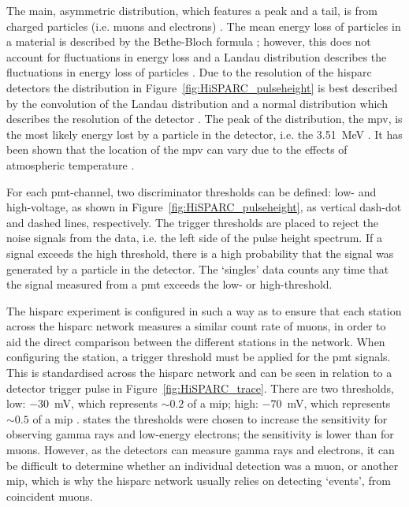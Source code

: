 The main, asymmetric distribution, which features a peak and a tail, is from charged particles (i.e. muons and electrons) \citep{van_dam_hisparc_2020}. The mean energy loss of particles in a material is described by the Bethe-Bloch formula \citep{bethe_bremsformel_1932, ziegler_stopping_1999}; however, this does not account for fluctuations in energy loss and a Landau distribution describes the fluctuations in energy loss of particles \citep{fokkema_hisparc_2012}. Due to the resolution of the \gls{hisparc} detectors the distribution in Figure~\ref{fig:HiSPARC_pulseheight} is best described by the convolution of the Landau distribution and a normal distribution which describes the resolution of the detector \citep{fokkema_hisparc_2012}. The peak of the distribution, the \gls{mpv}, is the most likely energy lost by a particle in the detector, i.e. the 3.51~MeV \citep{van_dam_hisparc_2020}. It has been shown that the location of the \gls{mpv} can vary due to the effects of atmospheric temperature \citep{bartels_hisparc_2012, van_dam_hisparc_2020}.

For each \gls{pmt}-channel, two discriminator thresholds can be defined: low- and high-voltage, as shown in Figure~\ref{fig:HiSPARC_pulseheight}, as vertical dash-dot and dashed lines, respectively.  The trigger thresholds are placed to reject the noise signals from the data, i.e. the left side of the pulse height spectrum. If a signal exceeds the high threshold, there is a high probability that the signal was generated by a particle in the detector. The `singles' data counts any time that the signal measured from a \gls{pmt} exceeds the low- or high-threshold.

The \gls{hisparc} experiment is configured in such a way as to ensure that each station across the \gls{hisparc} network measures a similar count rate of muons, in order to aid the direct comparison between the different stations in the network. When configuring the station, a trigger threshold must be applied for the \gls{pmt} signals. This is standardised across the \gls{hisparc} network and can be seen in relation to a detector trigger pulse in Figure~\ref{fig:HiSPARC_trace}. There are two thresholds, low: $-30$~mV, which represents $\sim0.2$ of a \gls{mip}; high: $-70$~mV, which represents $\sim0.5$ of a \gls{mip} \citep{fokkema_hisparc_2012, van_dam_hisparc_2020}. \citet{van_dam_hisparc_2020} states the thresholds were chosen to increase the sensitivity for observing gamma rays and low-energy electrons; the sensitivity is lower than for muons. However, as the detectors can measure gamma rays and electrons, it can be difficult to determine whether an individual detection was a muon, or another \gls{mip}, which is why the \gls{hisparc} network usually relies on detecting `events', from coincident muons.

